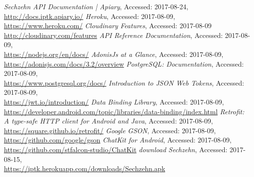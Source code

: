 \documentclass[11pt, accentcolor=tud1c]{tudreport}
\begin{document}
\begin{thebibliography}{9}
		\textit{Sechzehn API Documentation | Apiary}, 
		Accessed: 2017-08-24, \\
		\url{http://docs.iptk.apiary.io/}
		\textit{Heroku}, 
		Accessed: 2017-08-09, \\
		\url{https://www.heroku.com/}
		\textit{Cloudinary Features}, 
		Accessed: 2017-08-09 \\
		\url{http://cloudinary.com/features}
		\textit{API Reference Documentation}, 
		Accessed: 2017-08-09, \\
		\url{https://nodejs.org/en/docs/}
		\textit{AdonisJs at a Glance}, 
		Accessed: 2017-08-09, \\
		\url{https://adonisjs.com/docs/3.2/overview}
		\textit{PostgreSQL: Documentation}, 
		Accessed: 2017-08-09, \\
		\url{https://www.postgresql.org/docs/}
		\textit{Introduction to JSON Web Tokens}, 
		Accessed: 2017-08-09, \\
		\url{https://jwt.io/introduction/}
		\textit{Data Binding Library}, 
		Accessed: 2017-08-09, \\
		\url{https://developer.android.com/topic/libraries/data-binding/index.html}
		\textit{Retrofit: A type-safe HTTP client for Android and Java}, 
		Accessed: 2017-08-09, \\	
		\url{https://square.github.io/retrofit/}
		\textit{Google GSON}, 
		Accessed: 2017-08-09, \\
		\url{https://github.com/google/gson}
		\textit{ChatKit for Android}, 
		Accessed: 2017-08-09, \\
		\url{https://github.com/stfalcon-studio/ChatKit}
		\textit{download Sechzehn}, 
		Accessed: 2017-08-15, \\
		\url{https://iptk.herokuapp.com/downloads/Sechzehn.apk}	
\end{thebibliography}
\end{document}
